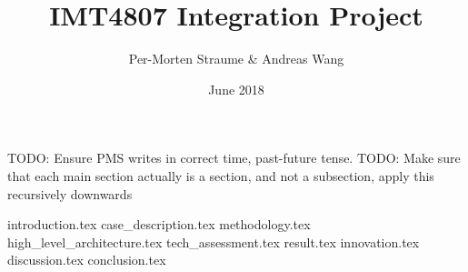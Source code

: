 \documentclass{article}
\title{IMT4807 Integration Project}
\author{Per-Morten Straume \& Andreas Wang}
\date{June 2018}
\newcommand{\todo}[1]{{\color{blue}TODO: #1}}
\begin{document}
\maketitle



\todo{Ensure PMS writes in correct time, past-future tense.}
\todo{Make sure that each main section actually is a section, and not a subsection, apply this recursively downwards}

%
%


{introduction.tex}
{case_description.tex}
{methodology.tex} %
{high_level_architecture.tex}
{tech_assessment.tex}
{result.tex}
{innovation.tex}
{discussion.tex}
{conclusion.tex}




\end{document}
